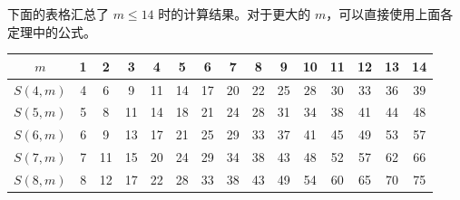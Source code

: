 \documentclass[11pt]{ctexart}
\theoremstyle{definition}
\begin{document}
下面的表格汇总了 $m\le14$ 时的计算结果。对于更大的 $m$，可以直接使用上面各定理中的公式。
\begin{center}\small
\begin{tabular}{c|cccccccccccccc}
\toprule
$m$ & 1&2&3&4&5&6&7&8&9&10&11&12&13&14\\
\midrule
$S(4,m)$ & 4&6&9&11&14&17&$20$&22&25&$28$&30&33&$36$&$39$\\
$S(5,m)$ & 5&8&11&14&18&21&24&28&31&34&38&41&44&48\\
$S(6,m)$ & 6&9&13&17&21&25&29&33&37&41&45&49&53&57\\
$S(7,m)$ & 7&11&15&20&24&29&34&38&43&48&52&57&62&66\\
$S(8,m)$ & 8&12&17&22&28&33&38&43&49&54&60&65&70&75\\
\bottomrule
\end{tabular}
\end{center}
\end{document}
